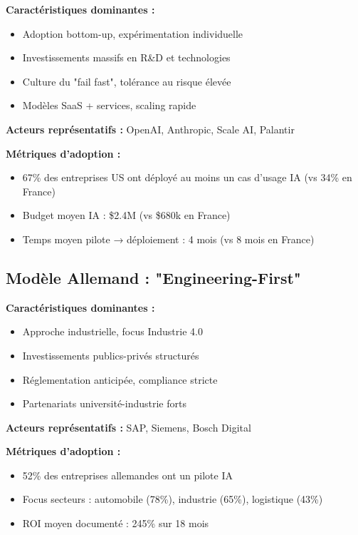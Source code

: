 \textbf{Caractéristiques dominantes :}
\begin{itemize}
    \item Adoption bottom-up, expérimentation individuelle
    \item Investissements massifs en R\&D et technologies
    \item Culture du "fail fast", tolérance au risque élevée
    \item Modèles SaaS + services, scaling rapide
\end{itemize}

\textbf{Acteurs représentatifs :} OpenAI, Anthropic, Scale AI, Palantir

\textbf{Métriques d'adoption :}
\begin{itemize}
    \item 67\% des entreprises US ont déployé au moins un cas d'usage IA (vs 34\% en France)
    \item Budget moyen IA : \$2.4M (vs \$680k en France)
    \item Temps moyen pilote → déploiement : 4 mois (vs 8 mois en France)
\end{itemize}

\subsection{Modèle Allemand : "Engineering-First"}

\textbf{Caractéristiques dominantes :}
\begin{itemize}
    \item Approche industrielle, focus Industrie 4.0
    \item Investissements publics-privés structurés
    \item Réglementation anticipée, compliance stricte
    \item Partenariats université-industrie forts
\end{itemize}

\textbf{Acteurs représentatifs :} SAP, Siemens, Bosch Digital

\textbf{Métriques d'adoption :}
\begin{itemize}
    \item 52\% des entreprises allemandes ont un pilote IA
    \item Focus secteurs : automobile (78\%), industrie (65\%), logistique (43\%)
    \item ROI moyen documenté : 245\% sur 18 mois
\end{itemize}

